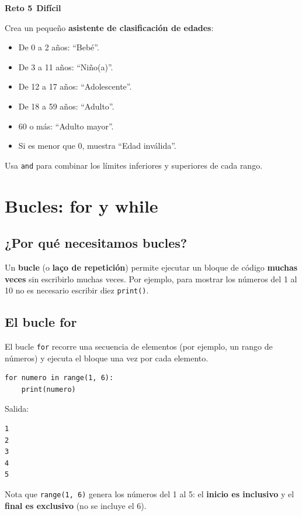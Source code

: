 \documentclass[11pt,a4paper]{article}
\newcommand{\dificil}{\textcolor{rojoAlerta}{\faIcon{circle}\,\textbf{Difícil}}}
\begin{document}
\begin{cajaReto}
\textbf{Reto 5} \dificil

Crea un pequeño \textbf{asistente de clasificación de edades}:
\begin{itemize}
    \item De 0 a 2 años: ``Bebé''.
    \item De 3 a 11 años: ``Niño(a)''.
    \item De 12 a 17 años: ``Adolescente''.
    \item De 18 a 59 años: ``Adulto''.
    \item 60 o más: ``Adulto mayor''.
    \item Si es menor que 0, muestra ``Edad inválida''.
\end{itemize}
Usa \texttt{and} para combinar los límites inferiores y superiores de cada rango.
\end{cajaReto}

\section{Bucles: for y while}

\subsection{¿Por qué necesitamos bucles?}

Un \textbf{bucle} (o \textbf{laço de repetición}) permite ejecutar un bloque de código \textbf{muchas veces} sin escribirlo muchas veces. Por ejemplo, para mostrar los números del 1 al 10 no es necesario escribir diez \texttt{print()}.

\subsection{El bucle for}

El bucle \texttt{for} recorre una secuencia de elementos (por ejemplo, un rango de números) y ejecuta el bloque una vez por cada elemento.

\begin{cajaEjemplo}
\begin{lstlisting}[style=pythonStyle, caption={Mostrar números del 1 al 5}]
for numero in range(1, 6):
    print(numero)
\end{lstlisting}

Salida:
\begin{lstlisting}[style=pythonStyle]
1
2
3
4
5
\end{lstlisting}

Nota que \texttt{range(1, 6)} genera los números del 1 al 5: el \textbf{inicio es inclusivo} y el \textbf{final es exclusivo} (no se incluye el 6).
\end{cajaEjemplo}
\end{document}
